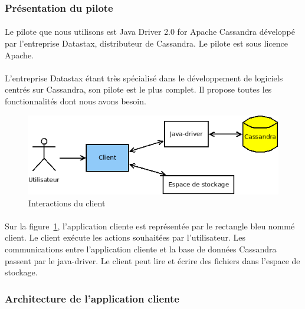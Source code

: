 \documentclass[12pt]{article}
\begin{document}
\subsubsection{Présentation du pilote}
\paragraph{} Le pilote que nous utilisons est Java Driver 2.0 for Apache Cassandra développé par l'entreprise Datastax, distributeur de Cassandra. Le pilote est sous licence Apache.

\paragraph{} L'entreprise Datastax étant très spécialisé dans le développement de logiciels centrés sur Cassandra, son pilote est le plus complet. Il propose
toutes les fonctionnalités dont nous avons besoin.

\begin{figure}[h]
	\centering
		\includegraphics[width=12cm]{images/client/acteurs.png}
	\caption{Interactions du client \label{fig:client_acteurs}}
\end{figure}

\paragraph{} Sur la figure~\ref{fig:client_acteurs}, l'application cliente est représentée par le rectangle bleu nommé client.
Le client exécute les actions souhaitées par l'utilisateur. Les communications entre l'application cliente et la base de données Cassandra passent par le java-driver.
Le client peut lire et écrire des fichiers dans l'espace de stockage.

\subsubsection{Architecture de l'application cliente}
\end{document}
